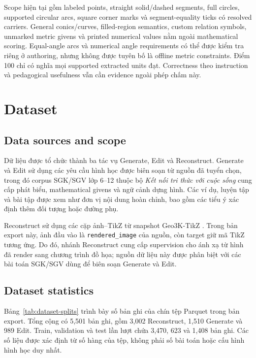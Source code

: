 \documentclass[a4paper,12pt]{article}
\begin{document}
Scope hiện tại gồm labeled points, straight solid/dashed segments, full circles, supported circular arcs, square corner marks và segment-equality ticks có resolved carriers. General conics/curves, filled-region semantics, custom relation symbols, unmarked metric givens và printed numerical values nằm ngoài mathematical scoring. Equal-angle arcs và numerical angle requirements có thể được kiểm tra riêng ở authoring, nhưng không được tuyên bố là offline metric constraints. Điểm 100 chỉ có nghĩa mọi supported extracted units đạt. Correctness theo instruction và pedagogical usefulness vẫn cần evidence ngoài phép chấm này.

\section{Dataset}
\label{sec:dataset}
\subsection{Data sources and scope}
Dữ liệu được tổ chức thành ba tác vụ Generate, Edit và Reconstruct. Generate và Edit sử dụng các yêu cầu hình học được biên soạn từ nguồn đã tuyển chọn, trong đó corpus SGK/SGV lớp 6--12 thuộc bộ \emph{Kết nối tri thức với cuộc sống} cung cấp phát biểu, mathematical givens và ngữ cảnh dựng hình. Các ví dụ, luyện tập và bài tập được xem như đơn vị nội dung hoàn chỉnh, bao gồm các tiểu ý xác định thêm đối tượng hoặc đường phụ.

Reconstruct sử dụng các cặp ảnh--TikZ từ snapshot Geo3K-TikZ \cite{geo3ktikz}. Trong bản export này, ảnh đầu vào là \texttt{rendered\_image} của nguồn, còn target giữ mã TikZ tương ứng. Do đó, nhánh Reconstruct cung cấp supervision cho ánh xạ từ hình đã render sang chương trình đồ họa; nguồn dữ liệu này được phân biệt với các bài toán SGK/SGV dùng để biên soạn Generate và Edit.

\subsection{Dataset statistics}
Bảng~\ref{tab:dataset-splits} trình bày số bản ghi của chín tệp Parquet trong bản export. Tổng cộng có 5,501 bản ghi, gồm 3,002 Reconstruct, 1,510 Generate và 989 Edit. Train, validation và test lần lượt chứa 3,470, 623 và 1,408 bản ghi. Các số liệu được xác định từ số hàng của tệp, không phải số bài toán hoặc cấu hình hình học duy nhất.
\end{document}
